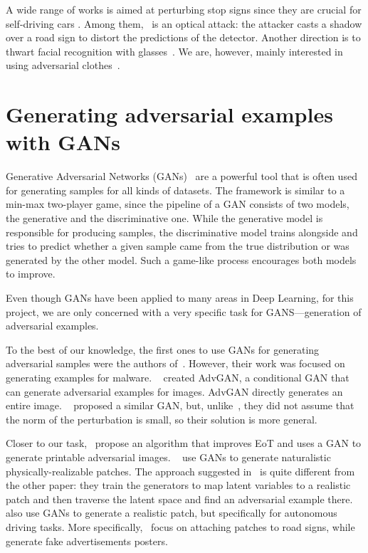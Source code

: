 A wide range of works is aimed at perturbing stop signs since they are crucial for self-driving cars \cite{signs_digital, stop_signs_detectors_380, sign_shapeshifter, sign_2020_16, signs_shadows}.
Among them,~\cite{signs_shadows} is an optical attack: the attacker casts a shadow over a road sign to distort the predictions of the detector.
Another direction is to thwart facial recognition with glasses~\cite{glasses1, glasses2}.
We are, however, mainly interested in using adversarial clothes~\cite{texture, clothes2, clothes3, clothes4_inv_cloak, clothes5_tshirt, clothes6}.

\section{Generating adversarial examples with GANs}
Generative Adversarial Networks (GANs)~\cite{gan} are a powerful tool that is often used for generating samples for all kinds of datasets.
The framework is similar to a min-max two-player game, since the pipeline of a GAN consists of two models, the generative and the discriminative one. While the generative model is responsible for producing samples, the discriminative model trains alongside and tries to predict whether a given sample came from the true distribution or was generated by the other model.
Such a game-like process encourages both models to improve.

Even though GANs have been applied to many areas in Deep Learning, for this project, we are only concerned with a very specific task for GANS---generation of adversarial examples.

To the best of our knowledge, the first ones to use GANs for generating adversarial samples were the authors of~\cite{adv_gans_first}.
However, their work was focused on generating examples for malware.
~\cite{adv_gans} created AdvGAN, a conditional GAN that can generate adversarial examples for images.
AdvGAN directly generates an entire image.
~\cite{adv_gans_unrestrained} proposed a similar GAN, but, unlike~\cite{adv_gans}, they did not assume that the norm of the perturbation is small, so their solution is more general.

Closer to our task,~\cite{meta_attack} propose an algorithm that improves EoT and uses a GAN to generate printable adversarial images.
~\cite{clothes6, adv_gan_, adv_gan_latent} use GANs to generate naturalistic physically-realizable patches. 
The approach suggested in~\cite{clothes6, adv_gan_latent} is quite different from the other paper: they train the generators to map latent variables to a realistic patch and then traverse the latent space and find an adversarial example there.
~\cite{adv_gan_signs, adv_gan_advert} also use GANs to generate a realistic patch, but specifically for autonomous driving tasks.
More specifically,~\cite{adv_gan_signs} focus on attaching patches to road signs, while~\cite{adv_gan_advert} generate fake advertisements posters.

